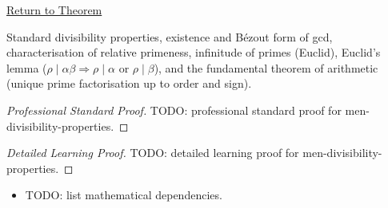 \newpage
{}
\label{prf:men-divisibility-properties}

\begin{remark*}[Return]
\hyperref[thm:men-divisibility-properties]{Return to Theorem}
\end{remark*}

\begin{theorem*}[Mendelson 5.2--5.9]
Standard divisibility properties, existence and B\'{e}zout form of gcd,
characterisation of relative primeness, infinitude of primes
(Euclid), Euclid's lemma ($\rho\mid\alpha\beta\Rightarrow\rho\mid\alpha$
or $\rho\mid\beta$), and the fundamental theorem of arithmetic
(unique prime factorisation up to order and sign).
\end{theorem*}

\begin{proof}[Professional Standard Proof]
\LRAProofBodyStart
TODO: professional standard proof for men-divisibility-properties.
\end{proof}

\begin{proof}[Detailed Learning Proof]
\LRAProofBodyStart
TODO: detailed learning proof for men-divisibility-properties.
\end{proof}

\begin{remark*}
\end{remark*}

\begin{dependencies}
\begin{itemize}
  \item TODO: list mathematical dependencies.
\end{itemize}
\end{dependencies}

\clearpage
